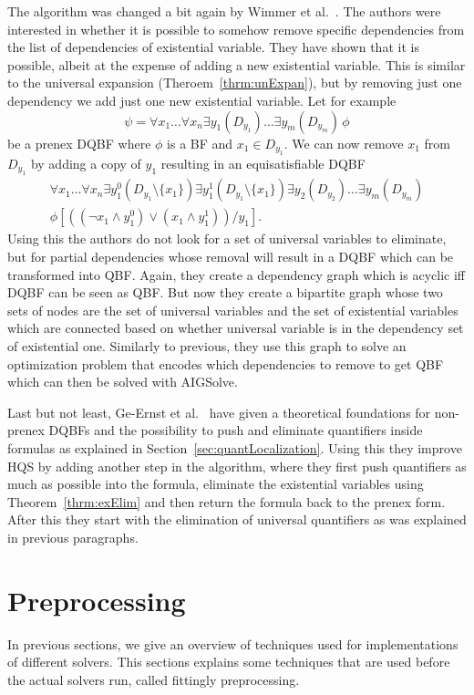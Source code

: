 \documentclass[
  digital, %
  twoside, %
  table,   %
  nolof,     %
  nolot,     %
]{fithesis3}
\theoremstyle{definition}
\theoremstyle{remark}
\newcommand{\itholds}{\,}
\begin{document}
The algorithm was changed a bit again by Wimmer et al.~\cite{HQSdependencyElimination}. The authors were interested in whether it is possible to somehow remove specific dependencies from the list of dependencies of existential variable. They have shown that it is possible, albeit at the expense of adding a new existential variable. This is similar to the universal expansion (Theroem~\ref{thrm:unExpan}), but by removing just one dependency we add just one new existential variable. Let for example
\[\psi = \forall x_1 \dots \forall x_n \exists y_1(D_{y_1}) \dots \exists y_m(D_{y_m}) \itholds \phi\]
be a prenex DQBF where $\phi$ is a BF and $x_1 \in D_{y_1}$. We can now remove $x_1$ from $D_{y_1}$ by adding a copy of $y_1$ resulting in an equisatisfiable DQBF
\begin{multline*}
\forall x_1 \dots \forall x_n \exists y_1^0(D_{y_1} \setminus \{x_1\}) \exists y_1^1(D_{y_1} \setminus \{x_1\}) \exists y_2(D_{y_2})\dots \exists y_m(D_{y_m}) \\
\phi\left[((\neg x_1 \land y_1^0) \lor (x_1 \land y_1^1))/y_1\right].
\end{multline*}
Using this the authors do not look for a set of universal variables to eliminate, but for partial dependencies whose removal will result in a DQBF which can be transformed into QBF. Again, they create a dependency graph which is acyclic iff DQBF can be seen as QBF. But now they create a bipartite graph whose two sets of nodes are the set of universal variables and the set of existential variables which are connected based on whether universal variable is in the dependency set of existential one. Similarly to previous, they use this graph to solve an optimization problem that encodes which dependencies to remove to get QBF which can then be solved with AIGSolve.

Last but not least, Ge-Ernst et al.~\cite{HQSquantifierLocalization} have given a theoretical foundations for non-prenex DQBFs and the possibility to push and eliminate quantifiers inside formulas as explained in Section~\ref{sec:quantLocalization}. Using this they improve HQS by adding another step in the algorithm, where they first push quantifiers as much as possible into the formula, eliminate the existential variables using Theorem~\ref{thrm:exElim} and then return the formula back to the prenex form. After this they start with the elimination of universal quantifiers as was explained in previous paragraphs.

\section{Preprocessing}
\label{sec:preprocessing}
In previous sections, we give an overview of techniques used for implementations of different solvers. This sections explains some techniques that are used before the actual solvers run, called fittingly preprocessing.
\end{document}
